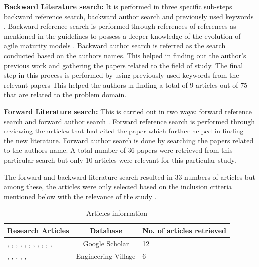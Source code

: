 \documentclass[a4paper,oneside]{bth}
\begin{document}
\textbf{Backward Literature search:} It is performed in three specific sub-steps backward reference search, backward author search and previously used keywords \cite{levy_systems_2006}. Backward reference search is performed through references of references as mentioned in the guidelines to possess a deeper knowledge of the evolution of agile maturity models \cite{levy_systems_2006}. Backward author search is referred as the search conducted based on the authors names. This helped in finding out the author's previous work and gathering the papers related to the field of study. The final step in this process is performed by using previously used keywords from the relevant papers This helped the authors in finding a total of 9 articles out of 75 that are related to the problem domain.

\textbf{Forward Literature search:} This is carried out in two ways: forward reference search and forward author search \cite{levy_systems_2006}. Forward reference search is performed through reviewing the articles that had cited the paper which further helped in finding the new literature. Forward author search is done by searching the papers related to the authors name. A total number of 36 papers were retrieved from this particular search but only 10 articles were relevant for this particular study.

The forward and backward literature search resulted in 33 numbers of articles but among these, the articles were only selected based on the inclusion criteria mentioned below with the relevance of the study \cite{kitchenham_systematic_2009}.
\begin{table}[h]
\centering
\caption{Articles information}
\label{articles}
\begin{tabular} {|p{6cm}|c|p{3cm}|}
\hline
\textbf{Research Articles} & \textbf{Database} & \textbf{No. of articles retrieved}\\ \hline
\cite{schweigert_agile_2013}, \cite{leppanen_comparative_2013}, \cite{fontana_maturing_2014}, \cite{ozcan-top_assessment_2013}, \cite{selleri_silva_reference_2014}, \cite{fontana_processes_2014}, \cite{fontana_progressive_2015}, \cite{qumer_framework_2008}, \cite{patel_agile_2009}, \cite{sidky_structured_2007}, \cite{benefield_seven_2010}, \cite{nawrocki_toward_2001}& Google Scholar & 12\\ \hline
\cite{pikkarainen_impact_2008}, \cite{pikkarainen_deploying_2005}, \cite{sfetsos_empirical_2010}, \cite{yin_scrum_2011}, \cite{ambler_agile_2009}, \cite{lui_road_2005}& Engineering Village & 6 \\ \hline
\end{tabular}
\end{table}
\end{document}
